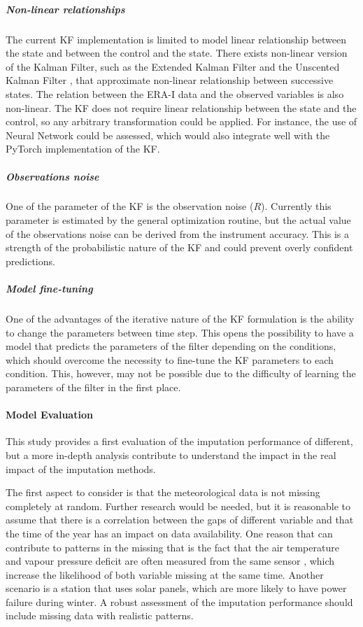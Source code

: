 \documentclass{article}
\begin{document}
\pagebreak[2]

\subparagraph{Non-linear relationships} The current KF implementation is limited to model linear relationship between the state and between the control and the state. There exists non-linear version of the Kalman Filter, such as the Extended Kalman Filter and the Unscented Kalman Filter \cite{dan_simon_optimal_2006}, that approximate non-linear relationship between successive states.
The relation between the ERA-I data and the observed variables is also non-linear\cite{vuichard_filling_2015}. The KF does not require linear relationship between the state and the control, so any arbitrary transformation could be applied. For instance, the use of Neural Network could be assessed, which would also integrate well with the PyTorch implementation of the KF.

\subparagraph{Observations noise} One of the parameter of the KF is the observation noise ($R$). Currently this parameter is estimated by the general optimization routine, but the actual value of the observations noise can be derived from the instrument accuracy. This is a strength of the probabilistic nature of the KF and could prevent overly confident predictions. 

\subparagraph{Model fine-tuning} One of the advantages of the iterative nature of the KF formulation is the ability to change the parameters between time step.  This opens the possibility to have a model that predicts the parameters of the filter depending on the conditions, which should overcome the necessity to fine-tune the KF parameters to each condition. This, however, may not be possible due to the difficulty of learning the parameters of the filter in the first place.

\paragraph{Model Evaluation} This study provides a first evaluation of the imputation performance of different, but a more in-depth analysis contribute to understand the impact in the real impact of the imputation methods.

The first aspect to consider is that the meteorological data is not missing completely at random. Further research would be needed, but it is reasonable to assume that there is a correlation between the gaps of different variable and that the time of the year has an impact on data availability. One reason that can contribute to patterns in the missing that is the fact that the air temperature and vapour pressure deficit are often measured from the same sensor \cite{noauthor_associated_2020, noauthor_specification_nodate}, which increase the likelihood of both variable missing at the same time. Another scenario is a station that uses solar panels, which are more likely to have power failure during winter. A robust assessment of the imputation performance should include missing data with realistic patterns.
\end{document}
